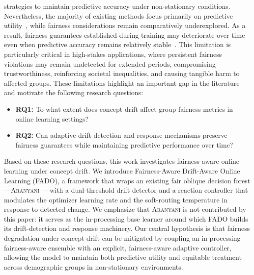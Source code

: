 \documentclass[sigconf,anonymous,review]{acmart}
\begin{document}
strategies to maintain predictive accuracy under non-stationary conditions. Nevertheless, the majority of existing methods focus primarily on 
predictive utility~\cite{10.1007/s10994-017-5642-8, KLAIBER20231261}, while fairness considerations remain comparatively underexplored. As a result, fairness guarantees established during training 
may deteriorate over time even when predictive accuracy remains relatively stable~\cite{Deho2025}. This limitation is particularly critical in high-stakes applications, 
where persistent fairness violations may remain undetected for extended periods, compromising trustworthiness, reinforcing societal inequalities, 
and causing tangible harm to affected groups. These limitations highlight an important gap in the literature and motivate the following research questions:
\begin{itemize}
\item \textbf{RQ1:} To what extent does concept drift affect group fairness metrics in online learning settings?
\item \textbf{RQ2:} Can adaptive drift detection and response mechanisms preserve fairness guarantees while maintaining predictive performance over time?
\end{itemize}
Based on these research questions, this work investigates fairness-aware online learning under concept drift. We introduce Fairness-Aware Drift-Aware Online Learning (\textsc{FADO}),
a framework that wraps an existing fair oblique decision forest—\textsc{Aranyani}~\cite{chowdhury2024enhancing}—with a dual-threshold drift detector and a reaction controller that
modulates the optimizer learning rate and the soft-routing temperature in response to detected change. We emphasize that \textsc{Aranyani} is not contributed by this paper:
it serves as the in-processing base learner around which \textsc{FADO} builds its drift-detection and response machinery. Our central hypothesis is that fairness degradation under
concept drift can be mitigated by coupling an in-processing fairness-aware ensemble with an explicit, fairness-aware adaptive controller, allowing the model to maintain both
predictive utility and equitable treatment across demographic groups in non-stationary environments.
\end{document}

